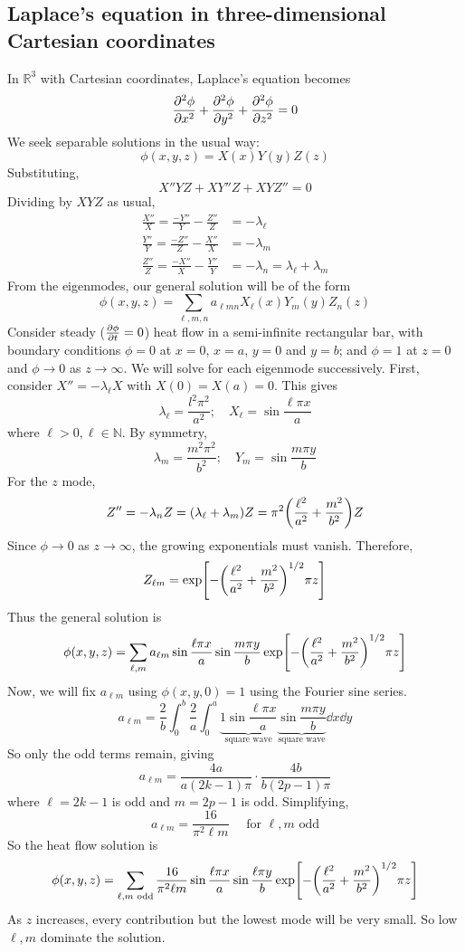 \subsection{Laplace's equation in three-dimensional Cartesian coordinates}
In \( \mathbb R^3 \) with Cartesian coordinates, Laplace's equation becomes
\[
	\pdv[2]{\phi}{x} + \pdv[2]{\phi}{y} + \pdv[2]{\phi}{z} = 0
\]
We seek separable solutions in the usual way:
\[
	\phi(x,y,z) = X(x)Y(y)Z(z)
\]
Substituting,
\[
	X''YZ + XY''Z + XYZ'' = 0
\]
Dividing by \( XYZ \) as usual,
\begin{align*}
	\frac{X''}{X} = \frac{-Y''}{Y} - \frac{Z''}{Z} & = -\lambda_\ell                         \\
	\frac{Y''}{Y} = \frac{-Z''}{Z} - \frac{X''}{X} & = -\lambda_m                            \\
	\frac{Z''}{Z} = \frac{-X''}{X} - \frac{Y''}{Y} & = -\lambda_n = \lambda_\ell + \lambda_m
\end{align*}
From the eigenmodes, our general solution will be of the form
\[
	\phi(x,y,z) = \sum_{\ell,m,n} a_{\ell mn} X_\ell(x) Y_m(y) Z_n(z)
\]
Consider steady (\(\pdv{\phi}{t} = 0 \)) heat flow in a semi-infinite rectangular bar, with boundary conditions \( \phi = 0 \) at \( x = 0 \), \( x = a \), \( y = 0 \) and \( y = b \); and \( \phi = 1 \) at \( z = 0 \) and \( \phi \to 0 \) as \( z \to \infty \).
We will solve for each eigenmode successively.
First, consider \( X'' = -\lambda_\ell X \) with \( X(0) = X(a) = 0 \).
This gives
\[
	\lambda_\ell = \frac{l^2 \pi^2}{a^2};\quad X_\ell = \sin \frac{\ell \pi x}{a}
\]
where \( \ell > 0, \ell \in \mathbb N \).
By symmetry,
\[
	\lambda_m = \frac{m^2 \pi^2}{b^2};\quad Y_m = \sin \frac{m \pi y}{b}
\]
For the \( z \) mode,
\[
	Z'' = -\lambda_n Z = (\lambda_\ell + \lambda_m) Z = \pi^2\qty(\frac{\ell^2}{a^2} + \frac{m^2}{b^2}) Z
\]
Since \( \phi \to 0 \) as \( z \to \infty \), the growing exponentials must vanish.
Therefore,
\[
	Z_{\ell m} = \exp[-\qty(\frac{\ell^2}{a^2} + \frac{m^2}{b^2})^{1/2} \pi z]
\]
Thus the general solution is
\[
	\phi(x,y,z) = \sum_{\ell, m} a_{\ell m} \sin \frac{\ell \pi x}{a} \sin \frac{m \pi y}{b} \exp[-\qty(\frac{\ell^2}{a^2} + \frac{m^2}{b^2})^{1/2} \pi z]
\]
Now, we will fix \( a_{\ell m} \) using \( \phi(x,y,0) = 1 \) using the Fourier sine series.
\[
	a_{\ell m} = \frac{2}{b} \int_0^b \frac{2}{a} \int_0^a \underbrace{1 \sin \frac{\ell \pi x}{a}}_{\text{square wave}} \underbrace{\sin \frac{m \pi y}{b}}_{\text{square wave}} \dd{x} \dd{y}
\]
So only the odd terms remain, giving
\[
	a_{\ell m} = \frac{4a}{a(2k-1)\pi} \cdot \frac{4b}{b(2p-1) \pi}
\]
where \( \ell = 2k-1 \) is odd and \( m = 2p-1 \) is odd.
Simplifying,
\[
	a_{\ell m} = \frac{16}{\pi^2 \ell m} \quad \text{ for } \ell, m \text{ odd}
\]
So the heat flow solution is
\[
	\phi(x,y,z) = \sum_{\ell, m \text{ odd}} \frac{16}{\pi^2 \ell m} \sin \frac{\ell \pi x}{a} \sin \frac{\ell \pi y}{b} \exp[-\qty(\frac{\ell^2}{a^2} + \frac{m^2}{b^2})^{1/2} \pi z]
\]
As \( z \) increases, every contribution but the lowest mode will be very small.
So low \( \ell, m \) dominate the solution.

